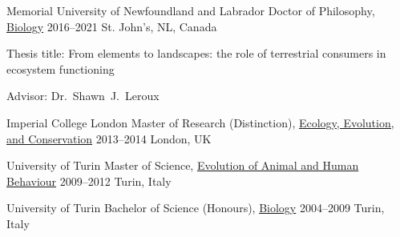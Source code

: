 

\begin{cventries}

  \cventry
    {Memorial University of Newfoundland and Labrador} %
    {Doctor of Philosophy, \href{http://www.mun.ca/biology}{Biology}} %
    {2016--2021} %
    {St. John's, NL, Canada} %
    {
      \begin{cvitems} %
        \item {Thesis title: From elements to landscapes: the role of terrestrial consumers in ecosystem functioning}
        \item {Advisor: Dr.~Shawn~J.~Leroux}
      \end{cvitems}
    }

  \cventry
    {Imperial College London} %
    {Master of Research (Distinction), \href{https://www.imperial.ac.uk/study/pg/life-sciences/ecology-evolution-conservation-research/}{Ecology, Evolution, and Conservation}} %
    {2013--2014} %
    {London, UK} %
    {}
  
  \cventry
    {University of Turin} %
    {Master of Science, \href{https://goo.gl/rCzbq7}{Evolution of Animal and Human Behaviour}} %
    {2009--2012} %
    {Turin, Italy} %
    {}
  
  \cventry
    {University of Turin} %
    {Bachelor of Science (Honours), \href{http://biologia.campusnet.unito.it/do/home.pl}{Biology}} %
    {2004--2009} %
    {Turin, Italy} %
    {}
\end{cventries}
